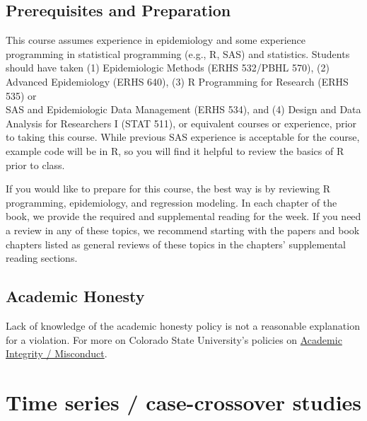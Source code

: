\documentclass[
]{book}
\begin{document}
\hypertarget{prerequisites-and-preparation}{%
\section{Prerequisites and Preparation}\label{prerequisites-and-preparation}}

This course assumes experience in epidemiology and some experience
programming in statistical programming (e.g., R, SAS) and statistics.
Students should have taken (1) Epidemiologic Methods (ERHS 532/PBHL 570),
(2) Advanced Epidemiology (ERHS 640),
(3) R Programming for Research (ERHS 535) or\\
SAS and Epidemiologic Data Management (ERHS 534),
and (4) Design and Data Analysis for Researchers I (STAT 511),
or equivalent courses or experience, prior
to taking this course. While previous SAS experience is acceptable for the
course, example code will be in R, so you will find it helpful to review the basics of R
prior to class.

If you would like to prepare for this course, the best way is by reviewing
R programming, epidemiology, and regression modeling. In each chapter of the book,
we provide the required and supplemental reading for the week. If you need a review
in any of these topics, we recommend starting with the papers and book chapters
listed as general reviews of these topics in the chapters' supplemental reading
sections.

\hypertarget{academic-honesty}{%
\section{Academic Honesty}\label{academic-honesty}}

Lack of knowledge of the academic honesty policy is not a reasonable explanation for a violation. For more on Colorado State University's policies on \href{https://catalog.colostate.edu/general-catalog/policies/students-responsibilities/\#academic-integrity}{Academic Integrity / Misconduct}.

\hypertarget{time-series-case-crossover-studies}{%
\chapter{Time series / case-crossover studies}\label{time-series-case-crossover-studies}}
\end{document}
